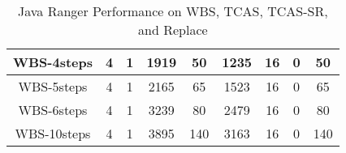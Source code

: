 \begin{table}[]
\begin{tabular}{@{}ccccccccc@{}}
        WBS-4steps                                                  & 4                                                            & 1                                                          & 1919                                                        & 50                                                             & 1235                                                           & 16                                                         & 0                                                             & 50       \\ \midrule
        WBS-5steps                                                  & 4                                                            & 1                                                          & 2165                                                        & 65                                                             & 1523                                                           & 16                                                         & 0                                                             & 65       \\ \midrule
        WBS-6steps                                                  & 4                                                            & 1                                                          & 3239                                                        & 80                                                             & 2479                                                           & 16                                                         & 0                                                             & 80       \\ \midrule
        WBS-10steps                                                 & 4                                                            & 1                                                          & 3895                                                        & 140                                                            & 3163                                                           & 16                                                         & 0                                                             & 140      \\ \bottomrule
    \end{tabular}
    \caption{Java Ranger Performance on WBS, TCAS, TCAS-SR, and Replace}
    \label{table:results}
\end{table}